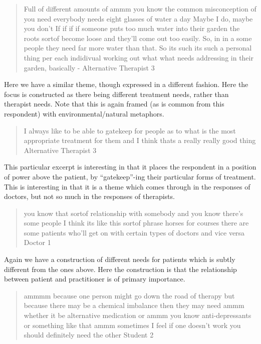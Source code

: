 \begin{quotation}
  Full of different amounts of ammm you know the common misconception of you need everybody needs eight glasses of water a day Maybe I do, maybe you don't If if if if someone puts too much water into their garden the roots sortof become loose and they'll come out too easily. So, in in a some people they need far more water than that. So its such its such a personal thing per each indidivual working out what what needs addressing in their garden, basically
 - Alternative Therapist 3
\end{quotation}

Here we have a similar theme, though expressed in a different fashion. Here the focus is constructed as there being different treatment needs, rather than therapist needs. Note that this is again framed (as is common from this respondent) with environmental/natural metaphors. 

\begin{quotation}
  I always like to be able to gatekeep for people as to what is the most appropriate treatment for them and I think thats a really really good thing
Alternative Therapist 3
\end{quotation}

This particular excerpt is interesting in that it places the respondent in a position of power above the patient, by ``gatekeep''-ing their particular forms of treatment. This is interesting in that it is a theme which comes through in the responses of doctors, but not so much in the responses of therapists. 

\begin{quotation}
  you know that sortof relationship with somebody and you know there's some people I think its like this sortof phrase horses for courses there are some patients who'll get on with certain types of doctors and vice versa
Doctor 1
\end{quotation}

Again we have a construction of different needs for patients which is subtly different from the ones above. Here the construction is that the relationship between patient and practitioner is of primary importance. 

\begin{quotation}
   ammmm because one person might go down the road of therapy but because there may be a chemical imbalance then they may need ammm whether it be alternative medication or ammm you know anti-depressants or something like that ammm sometimes I feel if one doesn't work you should definitely need the other
Student 2
\end{quotation}

